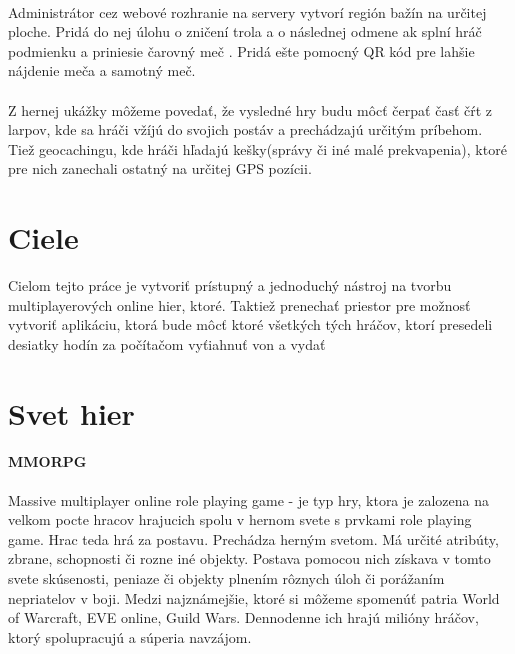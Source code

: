 \paragraph{}
Administrátor cez webové rozhranie na servery vytvorí región bažín na určitej ploche. Pridá do nej úlohu o zničení trola a o následnej odmene ak splní hráč podmienku a priniesie čarovný meč . Pridá ešte pomocný QR kód pre lahšie nájdenie meča a samotný meč.\

\paragraph{}
Z hernej ukážky môžeme povedať, že vysledné hry budu môcť čerpať časť čŕt z larpov, kde sa hráči vžíjú do svojich postáv a prechádzajú určitým príbehom. Tiež geocachingu, kde hráči hľadajú kešky(správy či iné malé prekvapenia), ktoré pre nich zanechali ostatný na určitej GPS pozícii.


\section{Ciele}
Cielom tejto práce je vytvoriť prístupný a jednoduchý nástroj na tvorbu multiplayerových online hier, ktoré. Taktiež prenechať priestor pre možnosť vytvoriť aplikáciu, ktorá bude môcť  ktoré všetkých tých hráčov, ktorí presedeli desiatky hodín za počítačom vyťiahnuť von a vydať

\section{Svet hier}
\paragraph{MMORPG}
Massive multiplayer online role playing game - je typ hry, ktora je zalozena na velkom pocte hracov hrajucich spolu v hernom svete s prvkami role playing game. Hrac teda hrá za postavu. Prechádza herným svetom. Má určité atribúty, zbrane, schopnosti či rozne iné objekty. Postava pomocou nich získava v tomto svete skúsenosti, peniaze či objekty plnením rôznych úloh či porážaním nepriatelov v boji. 
Medzi najznámejšie, ktoré si môžeme spomenúť patria World of Warcraft, EVE online, Guild Wars. Dennodenne ich hrajú milióny hráčov, ktorý spolupracujú a súperia navzájom.

